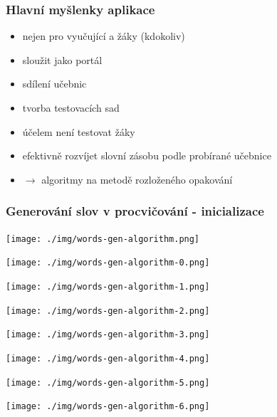 \begin{frame}[t]
    \frametitle{Hlavní myšlenky aplikace}
    \begin{itemize}[<+->]
        \item nejen pro vyučující a žáky (kdokoliv)
        \item sloužit jako portál
        \item sdílení učebnic
        \item tvorba testovacích sad
        \item účelem není testovat žáky
        \item efektivně rozvíjet slovní zásobu podle probírané učebnice
        \item $\rightarrow$ algoritmy na metodě rozloženého opakování
    \end{itemize}
\end{frame}

\begin{frame}[t]
    \frametitle{Generování slov v procvičování - inicializace}
     {\begin{center}\texttt{[image: ./img/words-gen-algorithm.png]}\end{center}}
     {\begin{center}\texttt{[image: ./img/words-gen-algorithm-0.png]}\end{center}}
     {\begin{center}\texttt{[image: ./img/words-gen-algorithm-1.png]}\end{center}}
     {\begin{center}\texttt{[image: ./img/words-gen-algorithm-2.png]}\end{center}}
     {\begin{center}\texttt{[image: ./img/words-gen-algorithm-3.png]}\end{center}}
     {\begin{center}\texttt{[image: ./img/words-gen-algorithm-4.png]}\end{center}}
     {\begin{center}\texttt{[image: ./img/words-gen-algorithm-5.png]}\end{center}}
     {\begin{center}\texttt{[image: ./img/words-gen-algorithm-6.png]}\end{center}}
\end{frame}

